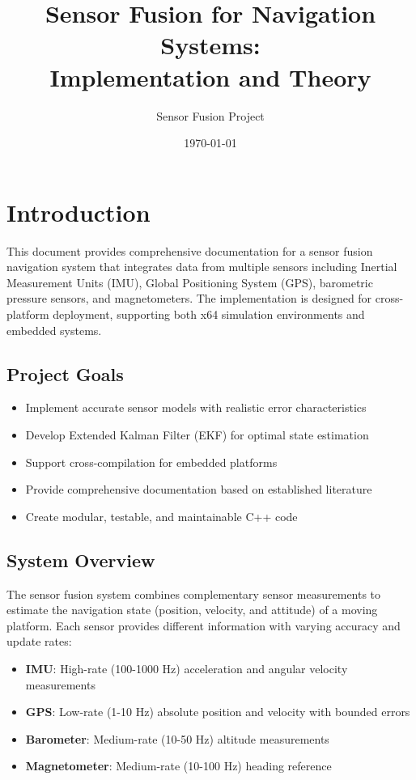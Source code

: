 \documentclass[12pt,a4paper]{article}
\title{Sensor Fusion for Navigation Systems:\\
Implementation and Theory}
\author{Sensor Fusion Project}
\date{\today}
\begin{document}
\maketitle
\tableofcontents
\newpage

\section{Introduction}

This document provides comprehensive documentation for a sensor fusion navigation system that integrates data from multiple sensors including Inertial Measurement Units (IMU), Global Positioning System (GPS), barometric pressure sensors, and magnetometers. The implementation is designed for cross-platform deployment, supporting both x64 simulation environments and embedded systems.

\subsection{Project Goals}

\begin{itemize}
    \item Implement accurate sensor models with realistic error characteristics
    \item Develop Extended Kalman Filter (EKF) for optimal state estimation
    \item Support cross-compilation for embedded platforms
    \item Provide comprehensive documentation based on established literature
    \item Create modular, testable, and maintainable C++ code
\end{itemize}

\subsection{System Overview}

The sensor fusion system combines complementary sensor measurements to estimate the navigation state (position, velocity, and attitude) of a moving platform. Each sensor provides different information with varying accuracy and update rates:

\begin{itemize}
    \item \textbf{IMU}: High-rate (100-1000 Hz) acceleration and angular velocity measurements
    \item \textbf{GPS}: Low-rate (1-10 Hz) absolute position and velocity with bounded errors
    \item \textbf{Barometer}: Medium-rate (10-50 Hz) altitude measurements
    \item \textbf{Magnetometer}: Medium-rate (10-100 Hz) heading reference
\end{itemize}
\end{document}
